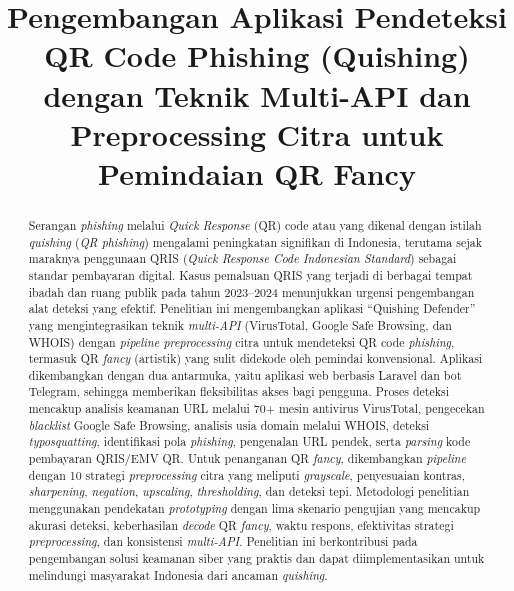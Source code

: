 \documentclass[conference]{IEEEtran}
\begin{document}
\title{Pengembangan Aplikasi Pendeteksi QR Code Phishing (Quishing) dengan Teknik Multi-API dan Preprocessing Citra untuk Pemindaian QR Fancy}

\author{
}

\maketitle

\begin{abstract}
Serangan \textit{phishing} melalui \textit{Quick Response} (QR) code atau yang dikenal dengan istilah \textit{quishing} (\textit{QR phishing}) mengalami peningkatan signifikan di Indonesia, terutama sejak maraknya penggunaan QRIS (\textit{Quick Response Code Indonesian Standard}) sebagai standar pembayaran digital. Kasus pemalsuan QRIS yang terjadi di berbagai tempat ibadah dan ruang publik pada tahun 2023--2024 menunjukkan urgensi pengembangan alat deteksi yang efektif. Penelitian ini mengembangkan aplikasi ``Quishing Defender'' yang mengintegrasikan teknik \textit{multi-API} (VirusTotal, Google Safe Browsing, dan WHOIS) dengan \textit{pipeline preprocessing} citra untuk mendeteksi QR code \textit{phishing}, termasuk QR \textit{fancy} (artistik) yang sulit didekode oleh pemindai konvensional. Aplikasi dikembangkan dengan dua antarmuka, yaitu aplikasi web berbasis Laravel dan bot Telegram, sehingga memberikan fleksibilitas akses bagi pengguna. Proses deteksi mencakup analisis keamanan URL melalui 70+ mesin antivirus VirusTotal, pengecekan \textit{blacklist} Google Safe Browsing, analisis usia domain melalui WHOIS, deteksi \textit{typosquatting}, identifikasi pola \textit{phishing}, pengenalan URL pendek, serta \textit{parsing} kode pembayaran QRIS/EMV QR. Untuk penanganan QR \textit{fancy}, dikembangkan \textit{pipeline} dengan 10 strategi \textit{preprocessing} citra yang meliputi \textit{grayscale}, penyesuaian kontras, \textit{sharpening}, \textit{negation}, \textit{upscaling}, \textit{thresholding}, dan deteksi tepi. Metodologi penelitian menggunakan pendekatan \textit{prototyping} dengan lima skenario pengujian yang mencakup akurasi deteksi, keberhasilan \textit{decode} QR \textit{fancy}, waktu respons, efektivitas strategi \textit{preprocessing}, dan konsistensi \textit{multi-API}. Penelitian ini berkontribusi pada pengembangan solusi keamanan siber yang praktis dan dapat diimplementasikan untuk melindungi masyarakat Indonesia dari ancaman \textit{quishing}.
\end{abstract}
\end{document}
